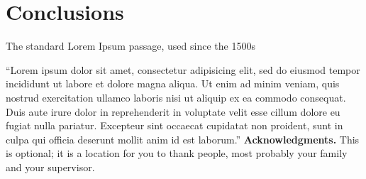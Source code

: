 \documentclass{mpaper}
\begin{document}
\section{Conclusions}

The standard Lorem Ipsum passage, used since the 1500s

``Lorem ipsum dolor sit amet, consectetur adipisicing elit, sed do eiusmod tempor incididunt ut labore et dolore magna aliqua. Ut enim ad minim veniam, quis nostrud exercitation ullamco laboris nisi ut aliquip ex ea commodo consequat. Duis aute irure dolor in reprehenderit in voluptate velit esse cillum dolore eu fugiat nulla pariatur. Excepteur sint occaecat cupidatat non proident, sunt in culpa qui officia deserunt mollit anim id est laborum.''
\vskip8pt \noindent
{\bf Acknowledgments.}
This is optional; it is a location for you to thank people, most probably your family and your supervisor.



\end{document}
